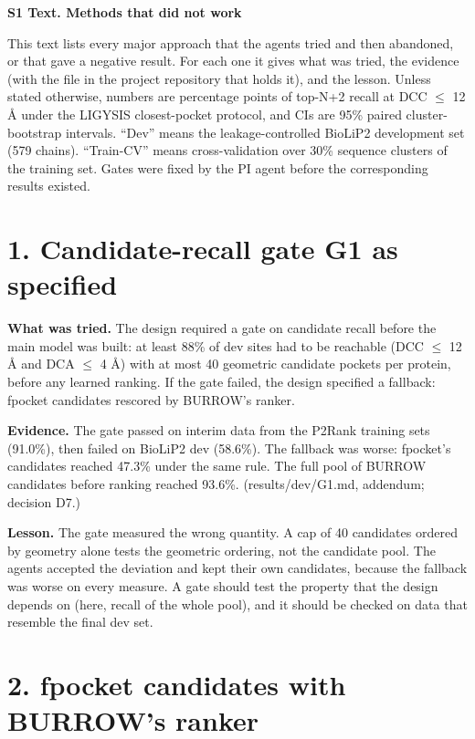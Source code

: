 \documentclass[10pt,letterpaper]{article}
\begin{document}
\begin{flushleft}
{\Large\textbf{S1 Text. Methods that did not work}}
\end{flushleft}
This text lists every major approach that the agents tried and then abandoned, or that gave a negative result. For each one it gives what was tried, the evidence (with the file in the project repository that holds it), and the lesson. Unless stated otherwise, numbers are percentage points of top-N+2 recall at DCC $\le$ 12 \AA{} under the LIGYSIS closest-pocket protocol, and CIs are 95\% paired cluster-bootstrap intervals. ``Dev'' means the leakage-controlled BioLiP2 development set (579 chains). ``Train-CV'' means cross-validation over 30\% sequence clusters of the training set. Gates were fixed by the PI agent before the corresponding results existed.

\section*{1. Candidate-recall gate G1 as specified}

\textbf{What was tried.} The design required a gate on candidate recall before the main model was built: at least 88\% of dev sites had to be reachable (DCC $\le$ 12 \AA{} and DCA $\le$ 4 \AA{}) with at most 40 geometric candidate pockets per protein, before any learned ranking. If the gate failed, the design specified a fallback: fpocket candidates rescored by BURROW's ranker.

\textbf{Evidence.} The gate passed on interim data from the P2Rank training sets (91.0\%), then failed on BioLiP2 dev (58.6\%). The fallback was worse: fpocket's candidates reached 47.3\% under the same rule. The full pool of BURROW candidates before ranking reached 93.6\%. (results/dev/G1.md, addendum; decision D7.)

\textbf{Lesson.} The gate measured the wrong quantity. A cap of 40 candidates ordered by geometry alone tests the geometric ordering, not the candidate pool. The agents accepted the deviation and kept their own candidates, because the fallback was worse on every measure. A gate should test the property that the design depends on (here, recall of the whole pool), and it should be checked on data that resemble the final dev set.

\section*{2. fpocket candidates with BURROW's ranker}
\end{document}

